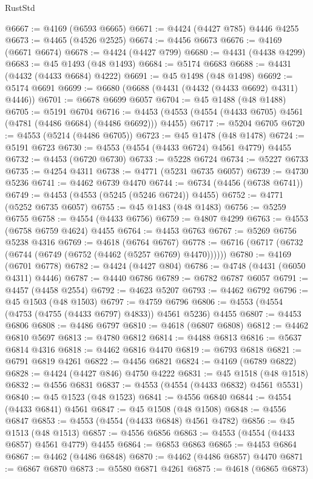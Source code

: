 \begin{lexlean}{RustStd}
\begin{coremodule}
@6667 := @4169 (@6593 @6665)
@6671 := @4424 (@4427 @785) @4446 @4255
@6673 := @4465 (@4526 @2525)
@6674 := @4456 @6673
@6676 := @4169 (@6671 @6674)
@6678 := @4424 (@4427 @799)
@6680 := @4431 (@4438 @4299)
@6683 := @45 @1493 (@48 @1493)
@6684 := @5174 @6683
@6688 := @4431 (@4432 (@4433 @6684) @4222)
@6691 := @45 @1498 (@48 @1498)
@6692 := @5174 @6691
@6699 := @6680 (@6688 (@4431 (@4432 (@4433 @6692) @4311) @4446))
@6701 := @6678 @6699 @6057
@6704 := @45 @1488 (@48 @1488)
@6705 := @5191 @6704
@6716 := @4453 (@4553 (@4554 (@4433 @6705) @4561 (@4781 (@4486 @6684) (@4486 @6692))) @4455)
@6717 := @5204 @6705
@6720 := @4553 (@5214 (@4486 @6705))
@6723 := @45 @1478 (@48 @1478)
@6724 := @5191 @6723
@6730 := @4553 (@4554 (@4433 @6724) @4561 @4779) @4455
@6732 := @4453 (@6720 @6730)
@6733 := @5228 @6724
@6734 := @5227 @6733
@6735 := @4254 @4311
@6738 := @4771 (@5231 @6735 @6057)
@6739 := @4730 @5236
@6741 := @4462 @6739 @4470
@6744 := @6734 (@4456 (@6738 @6741))
@6749 := @4453 (@4553 (@5245 (@5246 @6724)) @4455)
@6752 := @4771 (@5252 @6735 @6057)
@6755 := @45 @1483 (@48 @1483)
@6756 := @5259 @6755
@6758 := @4554 (@4433 @6756)
@6759 := @4807 @4299
@6763 := @4553 (@6758 @6759 @4624) @4455
@6764 := @4453 @6763
@6767 := @5269 @6756 @5238 @4316
@6769 := @4618 (@6764 @6767)
@6778 := @6716 (@6717 (@6732 (@6744 (@6749 (@6752 (@4462 (@5257 @6769) @4470))))))
@6780 := @4169 (@6701 @6778)
@6782 := @4424 (@4427 @804)
@6786 := @4748 (@4431 (@6050 @4311) @4446)
@6787 := @4440 @6786
@6789 := @6782 @6787 @6057
@6791 := @4457 (@4458 @2554)
@6792 := @4623 @5207
@6793 := @4462 @6792
@6796 := @45 @1503 (@48 @1503)
@6797 := @4759 @6796
@6806 := @4553 (@4554 (@4753 (@4755 (@4433 @6797) @4833)) @4561 @5236) @4455
@6807 := @4453 @6806
@6808 := @4486 @6797
@6810 := @4618 (@6807 @6808)
@6812 := @4462 @6810 @5697
@6813 := @4780 @6812
@6814 := @4488 @6813
@6816 := @5637 @6814 @4316
@6818 := @4462 @6816 @4470
@6819 := @6793 @6818
@6821 := @6791 @6819 @4261
@6822 := @4456 @6821
@6824 := @4169 (@6789 @6822)
@6828 := @4424 (@4427 @846) @4750 @4222
@6831 := @45 @1518 (@48 @1518)
@6832 := @4556 @6831
@6837 := @4553 (@4554 (@4433 @6832) @4561 @5531)
@6840 := @45 @1523 (@48 @1523)
@6841 := @4556 @6840
@6844 := @4554 (@4433 @6841) @4561
@6847 := @45 @1508 (@48 @1508)
@6848 := @4556 @6847
@6853 := @4553 (@4554 (@4433 @6848) @4561 @4782)
@6856 := @45 @1513 (@48 @1513)
@6857 := @4556 @6856
@6863 := @4553 (@4554 (@4433 @6857) @4561 @4779) @4455
@6864 := @6853 @6863
@6865 := @4453 @6864
@6867 := @4462 (@4486 @6848)
@6870 := @4462 (@4486 @6857) @4470
@6871 := @6867 @6870
@6873 := @5580 @6871 @4261
@6875 := @4618 (@6865 @6873)

\end{coremodule}
\end{lexlean}
